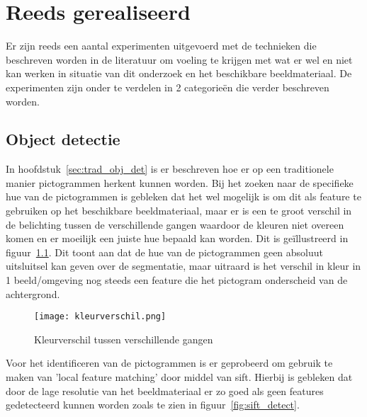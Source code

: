 
\chapter{Reeds gerealiseerd}

Er zijn reeds een aantal experimenten uitgevoerd met de technieken die beschreven worden in de literatuur om voeling te krijgen met wat er wel en niet kan werken in situatie van dit onderzoek
en het beschikbare beeldmateriaal. De experimenten zijn onder te verdelen in 2 categorie\"{e}n die verder beschreven worden.

\section{Object detectie}
   In hoofdstuk~\ref{sec:trad_obj_det} is er beschreven hoe er op een traditionele manier pictogrammen herkent kunnen worden.
   Bij het zoeken naar de specifieke hue van de pictogrammen is gebleken dat het wel mogelijk is om dit als feature te gebruiken op het beschikbare beeldmateriaal, maar
   er is een te groot verschil in de belichting tussen de verschillende gangen waardoor de kleuren niet overeen komen en er moeilijk een juiste hue bepaald kan worden.
   Dit is ge\"{i}llustreerd in figuur~\ref{fig:kleurverschil}. Dit toont aan dat de hue van de pictogrammen geen absoluut uitsluitsel kan geven over de segmentatie, maar uitraard
   is het verschil in kleur in 1 beeld/omgeving nog steeds een feature die het pictogram onderscheid van de achtergrond.
   
   \begin{figure}[!htb]
      \centering
      \texttt{[image: kleurverschil.png]}
      \caption{Kleurverschil tussen verschillende gangen}
      \label{fig:kleurverschil}
   \end{figure}

   Voor het identificeren van de pictogrammen is er geprobeerd om gebruik te maken van 'local feature matching' door middel van \gls{sift}. 
   Hierbij is gebleken dat door de lage resolutie van het beeldmateriaal er zo goed als geen features gedetecteerd kunnen worden zoals te zien in figuur~\ref{fig:sift_detect}.


